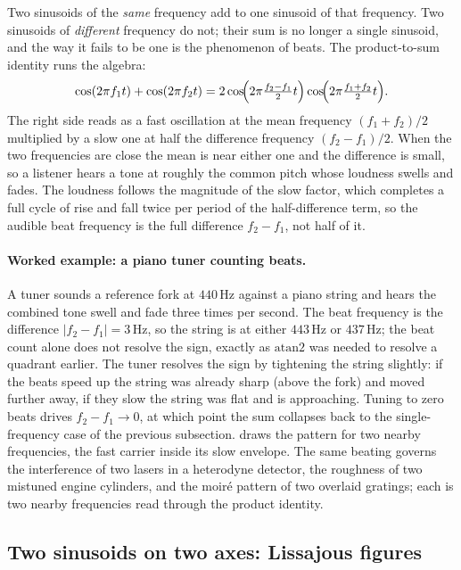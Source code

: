 Two sinusoids of the \emph{same} frequency add to one sinusoid of that
frequency. Two sinusoids of \emph{different} frequency do not; their
sum is no longer a single sinusoid, and the way it fails to be one is
the phenomenon of beats. The product-to-sum identity runs the algebra:
\[
  \cos(2\pi f_1 t) + \cos(2\pi f_2 t)
  = 2 \cos\!\Bigl(2\pi \tfrac{f_2 - f_1}{2} t\Bigr)
      \cos\!\Bigl(2\pi \tfrac{f_1 + f_2}{2} t\Bigr).
\]
The right side reads as a fast oscillation at the mean frequency
$(f_1 + f_2)/2$ multiplied by a slow one at half the difference
frequency $(f_2 - f_1)/2$. When the two frequencies are close the mean
is near either one and the difference is small, so a listener hears a
tone at roughly the common pitch whose loudness swells and fades. The
loudness follows the magnitude of the slow factor, which completes a
full cycle of rise and fall twice per period of the half-difference
term, so the audible beat frequency is the full difference $f_2 - f_1$,
not half of it.

\paragraph{Worked example: a piano tuner counting beats.}
A tuner sounds a reference fork at $440\,\si{\hertz}$ against a piano
string and hears the combined tone swell and fade three times per
second. The beat frequency is the difference $|f_2 - f_1| = 3\,\si
{\hertz}$, so the string is at either $443\,\si{\hertz}$ or
$437\,\si{\hertz}$; the beat count alone does not resolve the sign,
exactly as $\mathrm{atan2}$ was needed to resolve a quadrant earlier.
The tuner resolves the sign by tightening the string slightly: if the
beats speed up the string was already sharp (above the fork) and moved
further away, if they slow the string was flat and is approaching.
Tuning to zero beats drives $f_2 - f_1 \to 0$, at which point the sum
collapses back to the single-frequency case of the previous subsection.
 draws the pattern for two nearby
frequencies, the fast carrier inside its slow envelope. The same
beating governs the interference of two lasers in a heterodyne
detector, the roughness of two mistuned engine cylinders, and the
moir\'e pattern of two overlaid gratings; each is two nearby
frequencies read through the product identity.



\subsection{Two sinusoids on two axes: Lissajous figures}

